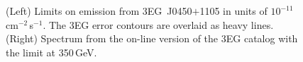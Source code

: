\begin{figure}[p]
\caption{\label{FIG::OBSERVATIONS::J0450} (Left) Limits on 
emission from 3EG~J0450$+$1105 in units of
$10^{-11}$\,cm$^{-2}$\,s$^{-1}$. The 3EG error contours are overlaid
as heavy lines. (Right) Spectrum from the on-line version of the 3EG
catalog with the limit at 350\,GeV.}
\end{figure}

